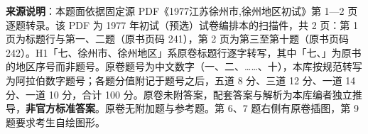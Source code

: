 


\begin{gktip}
\textbf{来源说明}：本题面依据固定源 PDF《1977江苏徐州市,徐州地区初试》第 1—2 页逐题转录。该 PDF 为 1977 年初试（预选）试卷编排本的扫描件，共 2 页：第 1 页为标题行与第一、二题（原书页码 241），第 2 页为第三至第十题（原书页码 242）。H1「七、徐州市、徐州地区」系原卷标题行逐字转写，其中「七、」为原书的地区序号而非题号。原卷题号为中文数字（一、二、……、十），本库按规范转写为阿拉伯数字题号；各题分值附记于题号之后，五道 8 分、三道 12 分、一道 14 分、一道 10 分，合计 100 分。原卷未附答案，配套答案与解析为本库编者独立推导，\textbf{非官方标准答案}。原卷无附加题与参考题。第 6、7 题右侧有原卷插图，第 9 题要求考生自绘图形。
\end{gktip}

\par\medskip

